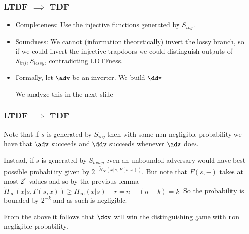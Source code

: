 \documentclass{beamer}
\begin{document}
\begin{frame}
    \frametitle{LTDF $\implies$ TDF}
    \begin{itemize}
        \item Completeness: Use the injective functions generated by $S_{inj}$.
        \item Soundness: We cannot (information theoretically) invert the lossy branch,
              so if we could invert the injective trapdoors we could distinguish outputs
              of $S_{inj}, S_{lossy}$, contradicting LDTFness.
        \item Formally, let $\adv$ be an inverter. We build $\ddv$
              \begin{pchstack}[center]
              \end{pchstack}
              We analyze this in the next slide
    \end{itemize}
\end{frame}

\begin{frame}
    \frametitle{LTDF $\implies$ TDF}
    Note that if $s$ is generated by $S_{inj}$ then with some non negligible probability
    we have that $\adv$ succeeds and $\ddv$ succeeds whenever $\adv$ does.

    Instead, if $s$ is generated by $S_{lossy}$ even an unbounded adversary
    would have best possible probability given by $2^{-\widetilde{H}_\infty(x|s, F(s, x))}$.
    But note that $F(s, {-})$ takes at most $2^r$ values and so by the previous
    lemma $\widetilde{H}_\infty(x|s, F(s, x)) \geq H_\infty(x|s) - r = n - (n - k) = k$.
    So the probability is bounded by $2^{-k}$ and as such is negligible.

    From the above it follows that $\ddv$ will win the distinguishing game with non negligible probability.

\end{frame}
\end{document}
